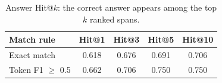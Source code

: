 \begin{table}[H]
\centering
\small
\caption{Answer Hit@$k$: the correct answer appears among the top $k$ ranked spans.}
\label{tab:qahits}
\begin{tabular}{lcccc}
\toprule
Match rule & Hit@1 & Hit@3 & Hit@5 & Hit@10 \\
\midrule
Exact match & 0.618 & 0.676 & 0.691 & 0.706 \\
Token F1 $\geq$ 0.5 & 0.662 & 0.706 & 0.750 & 0.750 \\
\bottomrule
\end{tabular}
\end{table}